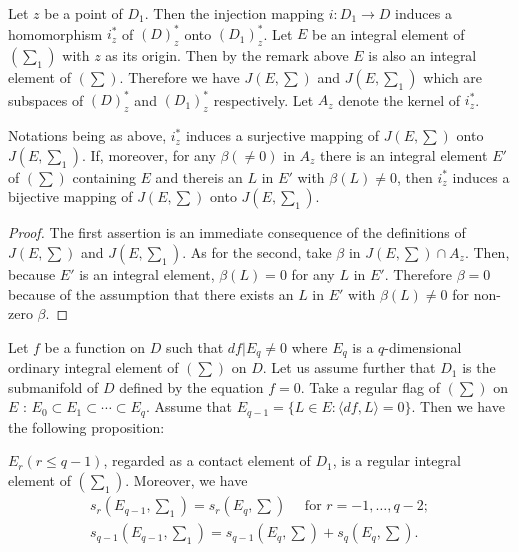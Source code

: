 Let $z$ be a point of $D_1$. Then the injection mapping $i : D_1 \to
D$ induces a homomorphism $i^*_z$ of $(D)^*_z$ onto $(D_1)^*_z$. Let
$E$ be an integral element of $(\sum_1)$ with $z$ as its origin. Then
by the remark above $E$ is also an integral element of
$(\sum)$. Therefore we  have $J(E, \sum)$ and $J (E,  \sum_1)$ which
are subspaces of $(D)^*_z$ and $(D_1)^*_z$ respectively. Let $A_z$
denote the kernel of $i^*_z$. 

\begin{proposition}\label{chap2:sec2.6:prop12} %
  Notations being as above,  $i^*_z$ induces a surjective mapping of
  $J(E,  \sum)$ onto $J (E,  \sum_1)$. If,  moreover,  for any $\beta
  (\neq 0)$ in $A_z$ there is an integral element $E'$ of $(\sum)$
  containing $E$ and there\pageoriginale is an $L$ in $E'$ with $\beta (L) \neq 0$,
  then $i^*_z$ induces a bijective mapping of $J (E,  \sum)$ onto
  $J(E,  \sum_1)$. 
\end{proposition} 

\begin{proof}
  The first assertion is an immediate consequence of the definitions
  of $J(E,  \sum)$ and $J(E,  \sum_1)$. As for the second,  take
  $\beta$ in $J(E,  \sum) \cap A_z$. Then,  because $E'$ is an
  integral element,  $\beta (L) = 0$ for any $L$ in $E'$. Therefore
  $\beta = 0$ because of the assumption that there exists an $L$ in
  $E'$ with $\beta (L) \neq 0$ for non-zero $\beta$. 
\end{proof} 
 
Let $f$ be a function on $D$ such that $df \big | E_q \neq 0$ where
$E_q$ is a $q$-dimensional ordinary integral element of $(\sum)$ on $D$.
Let us assume further that $D_1$ is the submanifold of $D$ defined by
the equation $f = 0$. Take a regular flag of $(\sum)$ on $E$ : $E_0
\subset E_1 \subset \cdots \subset E_q$. Assume that $E_{q-1} = \{L
\in E : \langle df,  L \rangle = 0 \}$. Then we have the following
proposition: 
\begin{proposition}\label{chap2:sec2.6:prop13} %
  $E_r (r \le q - 1)$,  regarded as a contact element of $D_1$,  is a
  regular integral element of $(\sum_1)$. Moreover,  we have  
  \begin{multline*}
    s_r \left(E_{q-1},  \sum_1\right) = s_r \left(E_q,  \sum\right)
    \quad \text { for } r =  - 1,  \ldots ,  q - 2;\\ 
    s_{q-1} \left(E_{q-1} ,  \sum_1\right) = s_{q-1} \left(E_q,
    \sum\right) + s_q \left(E_q, \sum\right). 
  \end{multline*}
\end{proposition}
 
